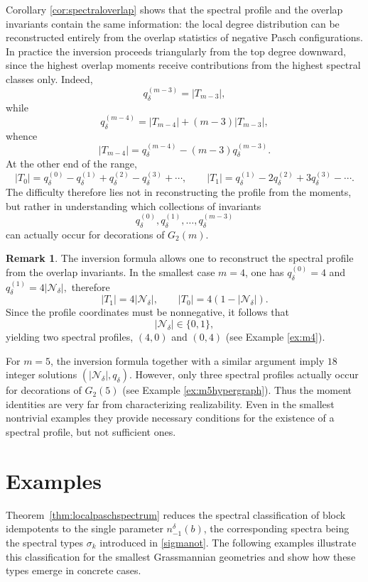 \documentclass[times,11pt,reqno]{amsproc}
\theoremstyle{definition}
\newtheorem{remark}[theorem]{Remark}
\numberwithin{equation}{section}
\begin{document}
Corollary \ref{cor:spectraloverlap} shows that the spectral profile and the overlap invariants contain the same information: the
local degree distribution can be reconstructed entirely from the overlap
statistics of negative Pasch configurations. In practice the inversion
proceeds triangularly from the top degree downward, since the highest
overlap moments receive contributions from the highest spectral classes
only. Indeed,
$$
q_\delta^{(m-3)}
=
|T_{m-3}|,
$$
while
$$
q_\delta^{(m-4)}
=
|T_{m-4}|
+
(m-3)|T_{m-3}|,
$$
whence
$$
|T_{m-4}|
=
q_\delta^{(m-4)}
-
(m-3)q_\delta^{(m-3)}.
$$
At the other end of the range,
$$
|T_0|
=
q_\delta^{(0)}
-
q_\delta^{(1)}
+
q_\delta^{(2)}
-
q_\delta^{(3)}
+\cdots,
\qquad
|T_1|
=
q_\delta^{(1)}
-
2q_\delta^{(2)}
+
3q_\delta^{(3)}
-\cdots.
$$
The difficulty therefore lies not in reconstructing the profile from the
moments, but rather in understanding which collections of invariants
$$
q_\delta^{(0)},
q_\delta^{(1)},
\dots,
q_\delta^{(m-3)}
$$
can actually occur for decorations of $G_2(m)$.


\begin{remark}
The inversion formula allows one to reconstruct the spectral profile
from the overlap invariants. In the smallest case $m=4$, one has
$q_\delta^{(0)}=4$ and $q_\delta^{(1)}=4|\mathcal N_\delta|,$
 therefore
$$
|T_1|
=
4|\mathcal N_\delta|,
\qquad
|T_0|
=
4(1-|\mathcal N_\delta|).
$$
Since the profile coordinates must be nonnegative, it follows that
$$
|\mathcal N_\delta|\in\{0,1\},
$$
yielding two spectral profiles,
$(4,0)$ and $(0,4)$ (see Example \ref{ex:m4}).

For $m=5$, the inversion formula together with a similar argument imply $18$ integer solutions $(|\mathcal N_\delta|,q_\delta)$.
However, only three spectral profiles actually occur for decorations of $G_2(5)$ (see Example \ref{ex:m5hypergraph}). Thus the moment identities are very far from characterizing
realizability. Even in the smallest nontrivial examples they provide
necessary conditions for the existence of a spectral profile, but not
sufficient ones.
\end{remark}



\section{Examples}\label{sec:exa}
Theorem~\ref{thm:localpaschspectrum} reduces the spectral classification of block idempotents to the single parameter $n_{-1}^{\delta}(b)$, the corresponding spectra being the spectral types $\sigma_k$ introduced in \eqref{sigmanot}. The following examples illustrate this classification for the smallest Grassmannian geometries and show how these types emerge in concrete cases.
\end{document}
